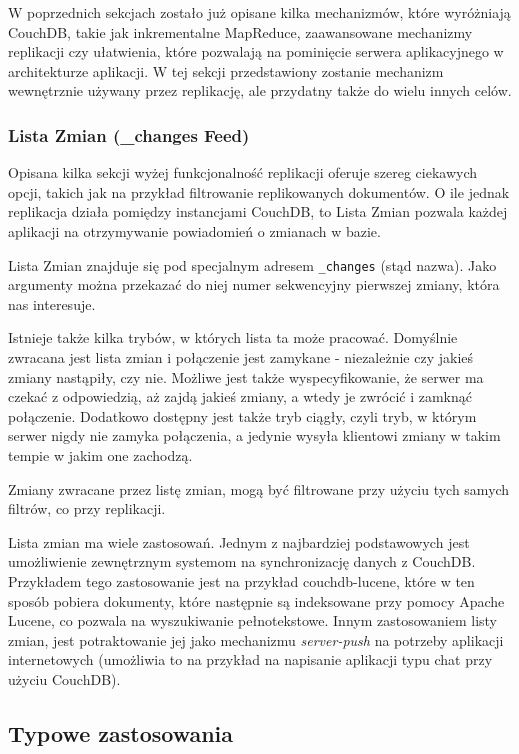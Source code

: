 W poprzednich sekcjach zostało już opisane kilka mechanizmów, które wyróżniają CouchDB, takie jak inkrementalne MapReduce, zaawansowane mechanizmy replikacji czy ułatwienia, które pozwalają na pominięcie serwera aplikacyjnego w architekturze aplikacji.
W tej sekcji przedstawiony zostanie mechanizm wewnętrznie używany przez replikację, ale przydatny także do wielu innych celów.

\subsubsection*{Lista Zmian (\_changes Feed)}

Opisana kilka sekcji wyżej funkcjonalność replikacji oferuje szereg ciekawych opcji, takich jak na przykład filtrowanie replikowanych dokumentów.
O ile jednak replikacja działa pomiędzy instancjami CouchDB, to Lista Zmian pozwala każdej aplikacji na otrzymywanie powiadomień o zmianach w bazie.

Lista Zmian znajduje się pod specjalnym adresem \verb+_changes+ (stąd nazwa).
Jako argumenty można przekazać do niej numer sekwencyjny pierwszej zmiany, która nas interesuje.

Istnieje także kilka trybów, w których lista ta może pracować.
Domyślnie zwracana jest lista zmian i połączenie jest zamykane - niezależnie czy jakieś zmiany nastąpiły, czy nie.
Możliwe jest także wyspecyfikowanie, że serwer ma czekać z odpowiedzią, aż zajdą jakieś zmiany, a wtedy je zwrócić i zamknąć połączenie.
Dodatkowo dostępny jest także tryb ciągły, czyli tryb, w którym serwer nigdy nie zamyka połączenia, a jedynie wysyła klientowi zmiany w takim tempie w jakim one zachodzą.

Zmiany zwracane przez listę zmian, mogą być filtrowane przy użyciu tych samych filtrów, co przy replikacji.

Lista zmian ma wiele zastosowań.
Jednym z najbardziej podstawowych jest umożliwienie zewnętrznym systemom na synchronizację danych z CouchDB.
Przykładem tego zastosowanie jest na przykład couchdb-lucene, które w ten sposób pobiera dokumenty, które następnie są indeksowane przy pomocy Apache Lucene, co pozwala na wyszukiwanie pełnotekstowe.
Innym zastosowaniem listy zmian, jest potraktowanie jej jako mechanizmu \emph{server-push} na potrzeby aplikacji internetowych (umożliwia to na przykład na napisanie aplikacji typu chat przy użyciu CouchDB).

\subsection*{Typowe zastosowania}

